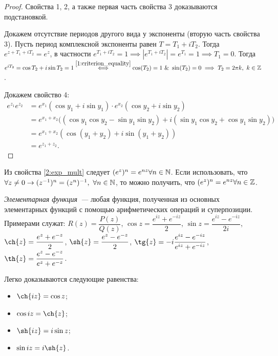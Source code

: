 \begin{proof}
Свойства 1, 2, а также первая часть свойства 3 доказываются подстановкой.

Докажем отсутствие периодов другого вида у экспоненты (вторую часть свойства 3). Пусть период
комплексной экспоненты равен \(T = T_1 + i T_2\). Тогда \(e^{z + T_1 + i T_2} = e^z\), в частности
\(e^{T_1 + i T_2} = 1 \implies |e^{T_1 + i T_2}| = e^{T_1} = 1 \implies T_1 = 0\). Тогда \(e^{iT_2}
= \cos{T_2} + i \sin{T_2} = 1 \overset{\ref{1:criterion_equality}}{\iff} \cos(T_2) = 1 \ \& \
\sin(T_2) = 0 \implies T_2 = 2 \pi k, \ k \in \mathbb{Z}\).

Докажем свойство 4:
\begin{align*}
    e^{z_1} e^{z_2}
    &= e^{x_1}(\cos y_1 + i\sin y_1) \cdot e^{x_2}(\cos y_2 + i\sin y_2) \\
    &= e^{x_1 + x_2} \Big( (\cos y_1 \cos y_2 - \sin y_1 \sin y_2) + i(\sin y_1 \cos y_2 + \cos y_1
        \sin y_2) \Big) \\
    &= e^{x_1 + x_2} (\cos(y_1 + y_2) + i\sin(y_1 + y_2)) \\
    &= e^{z_1 + z_2}.
\end{align*}
\end{proof}

\begin{corollary}
Из свойства \ref{2:exp_mult} следует \((e^z)^n = e^{nz} \forall n \in \mathbb{N}\). Если использовать, что 
\(\forall z \neq 0 \rightarrow (z^{-1})^n = (z^n)^{-1}, \  \forall n \in \mathbb{N}\), то можно получить, 
что \((e^z)^n = e^{nz} \forall n \in \mathbb{Z}\).
\end{corollary}

\begin{definition}
\textit{Элементарная функция~---} любая функция, полученная из основных элементарных функций с
помощью арифметических операций и суперпозиции. Примерами служат: \(R(z) = \dfrac{P(z)}{Q(z)}\),
\(\cos{z} = \dfrac{e^{iz} + e^{-iz}}{2}\), \(\sin{z} = \dfrac{e^{iz} - e^{-iz}}{2i}\), \(\ch{z} =
\dfrac{e^{z} + e^{-z}}{2}\), \(\sh{z} = \dfrac{e^{z} - e^{-z}}{2}\), \(\tg{z} = -i\dfrac{e^{iz} -
e^{-iz}}{e^{iz} + e^{-iz}}\), \(\th{z} = \dfrac{e^z - e^{-z}}{e^z + e^{-z}}\).
\end{definition}

\begin{note}
Легко доказываются следующие равенства:
\begin{itemize}
\item \(\ch{iz} = \cos{z}\);
\item \(\cos{iz} = \ch{z}\);
\item \(\sh{iz} = i\sin{z}\);
\item \(\sin{iz} = i\sh{z}\).
\end{itemize}
\end{note}


